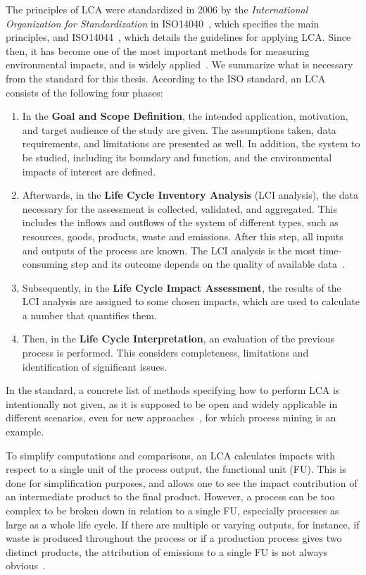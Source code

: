    The principles of LCA were standardized in 2006 by the \emph{International Organization for Standardization} in ISO14040~\autocite{iso14040}, which specifies the main principles, and ISO14044~\autocite{iso14044}, which details the guidelines for applying LCA.
    Since then, it has become one of the most important methods for measuring environmental impacts, and is widely applied~\autocite{kock2023}.
    We summarize what is necessary from the standard for this thesis.
    According to the ISO standard, an LCA consists of the following four phases:
    \begin{enumerate}
        \item In the \textbf{Goal and Scope Definition}, the intended application, motivation, and target audience of the study are given.
        The assumptions taken, data requirements, and limitations are presented as well.
        In addition, the system to be studied, including its boundary and function, and the environmental impacts of interest are defined.
        \item Afterwards, in the \textbf{Life Cycle Inventory Analysis} (LCI analysis), the data necessary for the assessment is collected, validated, and aggregated.
        This includes the inflows and outflows of the system of different types, such as resources, goods, products, waste and emissions.
        After this step, all inputs and outputs of the process are known.
        The LCI analysis is the most time-consuming step and its outcome depends on the quality of available data~\autocite{kock2023}.
        \item Subsequently, in the \textbf{Life Cycle Impact Assessment}, the results of the LCI analysis are assigned to some chosen impacts, which are used to calculate a number that quantifies them.
        \item Then, in the \textbf{Life Cycle Interpretation}, an evaluation of the previous process is performed.
        This considers completeness, limitations and identification of significant issues.
    \end{enumerate}
    In the standard, a concrete list of methods specifying how to perform LCA is intentionally not given, as it is supposed to be open and widely applicable in different scenarios, even for new approaches~\autocite{iso14040}, for which process mining is an example.



To simplify computations and comparisons, an LCA calculates impacts with respect to a single unit of the process output, the functional unit (FU).
This is done for simplification purposes, and allows one to see the impact contribution of an intermediate product to the final product.
However, a process can be too complex to be broken down in relation to a single FU, especially processes as large as a whole life cycle.
If there are multiple or varying outputs, for instance, if waste is produced throughout the process or if a production process gives two distinct products, the attribution of emissions to a single FU is not always obvious~\autocite{grahl}.



